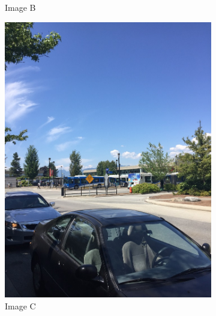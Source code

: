 \documentclass[]{article}
\begin{document}
\begin{figure}[h]
\begin{subfigure}[h]{0.2\textwidth}
		\centering
		\caption{Image B}
	\end{subfigure}%
	\hfill
	\begin{subfigure}[h]{0.2\textwidth}
		\includegraphics[scale=0.15]{results/3}
		\centering
		\caption{Image C}
	\end{subfigure}%
	\hfill
	\begin{subfigure}[h]{0.2\textwidth}

\end{subfigure}
\end{figure}
\end{document}
